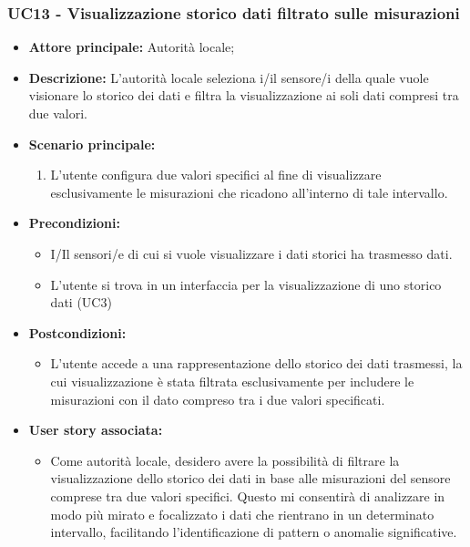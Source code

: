 \documentclass{article}
\begin{document}
\subsubsection{UC13 - Visualizzazione storico dati filtrato sulle misurazioni}
\begin{itemize}
    \item \textbf{Attore principale:} Autorità locale;
    \item \textbf{Descrizione:} L’autorità locale seleziona i/il sensore/i della quale vuole visionare lo storico dei dati e filtra la visualizzazione ai soli dati compresi tra due valori.
    \item \textbf{Scenario principale:}
          \begin{enumerate}
              \item L'utente configura due valori specifici al fine di visualizzare esclusivamente le misurazioni che ricadono all'interno di tale intervallo.
          \end{enumerate}
    \item \textbf{Precondizioni:}
          \begin{itemize}
              \item  I/Il sensori/e di cui si vuole visualizzare i dati storici ha trasmesso dati.
              \item  L'utente si trova in un interfaccia per la visualizzazione di uno storico dati (UC3)
          \end{itemize}
    \item \textbf{Postcondizioni:}
          \begin{itemize}
              \item  L'utente accede a una rappresentazione dello storico dei dati trasmessi, la cui visualizzazione è stata filtrata esclusivamente per includere le misurazioni con il dato compreso tra i due valori specificati.
          \end{itemize}
    \item \textbf{User story associata:}
          \begin{itemize}
            \item Come autorità locale, desidero avere la possibilità di filtrare la visualizzazione dello storico dei dati in base alle misurazioni del sensore comprese tra due valori specifici. Questo mi consentirà di analizzare in modo più mirato e focalizzato i dati che rientrano in un determinato intervallo, facilitando l'identificazione di pattern o anomalie significative.
          \end{itemize}
\end{itemize}
\end{document}
